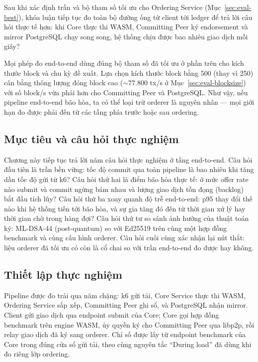 Sau khi xác định trần và bộ tham số tối ưu cho Ordering Service
(Mục~\ref{sec:eval-best}), khóa luận tiếp tục đo toàn bộ đường ống từ client tới
ledger để trả lời câu hỏi thực tế hơn: khi Core thực thi WASM, Committing Peer
ký endorsement và mirror PostgreSQL chạy song song, hệ thống chịu được bao
nhiêu giao dịch mỗi giây?

Mọi phép đo end-to-end dùng đúng bộ tham số đã tối ưu ở phần trên cho kích
thước block và chu kỳ đề xuất. Lựa chọn kích thước block bằng 500 (thay vì
250) cân bằng thông lượng đóng block cao (${\sim}77.800$ tx/s ở
Mục~\ref{sec:eval-blocksize}) với số block/s vừa phải hơn cho Committing Peer
và PostgreSQL. Như vậy, nếu pipeline end-to-end bão hòa, ta có thể loại trừ
orderer là nguyên nhân --- mọi giới hạn đo được phải đến từ các tầng phía
trước hoặc sau ordering.

\subsection{Mục tiêu và câu hỏi thực nghiệm}
\label{sec:e2e-goals}

Chương này tiếp tục trả lời năm câu hỏi thực nghiệm ở tầng end-to-end. Câu hỏi
đầu tiên là trần bền vững: tốc độ commit qua toàn pipeline là bao nhiêu khi
tăng dần tốc độ gửi từ k6? Câu hỏi thứ hai là điểm bão hòa thực tế: ở mức
offer rate nào submit và commit ngừng bám nhau và lượng giao dịch tồn đọng
(backlog) bắt đầu tích lũy? Câu hỏi thứ ba xoay quanh độ trễ end-to-end: p95
thay đổi thế nào khi hệ thống tiến tới bão hòa, và sự gia tăng đó đến từ thời
gian xử lý hay thời gian chờ trong hàng đợi? Câu hỏi thứ tư so sánh ảnh hưởng
của thuật toán ký: ML-DSA-44 (post-quantum) so với Ed25519 trên cùng một hợp
đồng benchmark và cùng cấu hình orderer. Câu hỏi cuối cùng xác nhận lại nút
thắt: liệu orderer đã tối ưu có còn là cổ chai so với trần end-to-end đo được
hay không.

\subsection{Thiết lập thực nghiệm}
\label{sec:e2e-setup}

Pipeline được đo trải qua năm chặng: k6 gửi tải, Core Service thực thi WASM,
Ordering Service sắp xếp, Committing Peer ghi sổ, và PostgreSQL nhận mirror.
Client gửi giao dịch qua endpoint submit của Core; Core gọi hợp đồng benchmark
trên engine WASM, ủy quyền ký cho Committing Peer qua libp2p, rồi relay giao
dịch đã ký sang orderer. Chỉ số được lấy từ endpoint benchmark của Core trong
đúng cửa sổ gửi tải, theo cùng nguyên tắc ``During load'' đã dùng khi đo riêng
lớp ordering.

